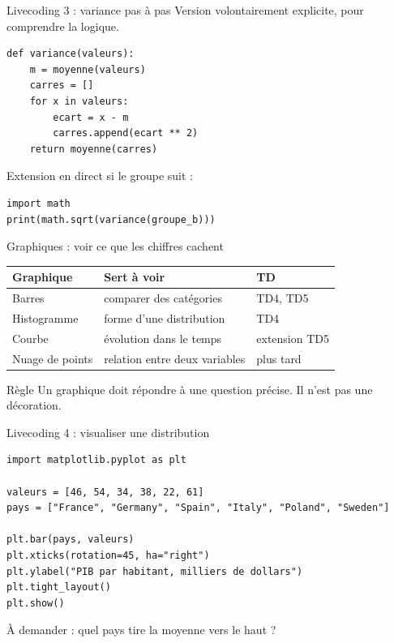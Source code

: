 \documentclass[10pt,aspectratio=169]{beamer}
\begin{document}
\begin{frame}[fragile]{Livecoding 3 : variance pas à pas}
Version volontairement explicite, pour comprendre la logique.
\begin{lstlisting}
def variance(valeurs):
    m = moyenne(valeurs)
    carres = []
    for x in valeurs:
        ecart = x - m
        carres.append(ecart ** 2)
    return moyenne(carres)
\end{lstlisting}
Extension en direct si le groupe suit :
\begin{lstlisting}
import math
print(math.sqrt(variance(groupe_b)))
\end{lstlisting}
\end{frame}

\begin{frame}{Graphiques : voir ce que les chiffres cachent}
\begin{tabular}{@{}lll@{}}
\toprule
Graphique & Sert à voir & TD \\
\midrule
Barres & comparer des catégories & TD4, TD5 \\
Histogramme & forme d'une distribution & TD4 \\
Courbe & évolution dans le temps & extension TD5 \\
Nuage de points & relation entre deux variables & plus tard \\
\bottomrule
\end{tabular}
\vspace{0.45cm}
\begin{block}{Règle}
Un graphique doit répondre à une question précise. Il n'est pas une décoration.
\end{block}
\end{frame}

\begin{frame}[fragile]{Livecoding 4 : visualiser une distribution}
\begin{lstlisting}
import matplotlib.pyplot as plt

valeurs = [46, 54, 34, 38, 22, 61]
pays = ["France", "Germany", "Spain", "Italy", "Poland", "Sweden"]

plt.bar(pays, valeurs)
plt.xticks(rotation=45, ha="right")
plt.ylabel("PIB par habitant, milliers de dollars")
plt.tight_layout()
plt.show()
\end{lstlisting}
À demander : quel pays tire la moyenne vers le haut ?
\end{frame}
\end{document}
